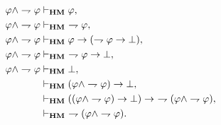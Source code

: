 	\begin{sketch}[LNC]
		\begin{align}
			\varphi \wedge \rightharpoondown \varphi &\vdash_{{\scriptsize \mbox{{\bf HM}}}} \varphi, \\
			\varphi \wedge \rightharpoondown \varphi &\vdash_{{\scriptsize \mbox{{\bf HM}}}}\ \rightharpoondown \varphi, \\
			\varphi \wedge \rightharpoondown \varphi &\vdash_{{\scriptsize \mbox{{\bf HM}}}}
				\varphi \rightarrow (\rightharpoondown \varphi \rightarrow \bot), \\
			\varphi \wedge \rightharpoondown \varphi &\vdash_{{\scriptsize \mbox{{\bf HM}}}}\ \rightharpoondown \varphi \rightarrow \bot, \\
			\varphi \wedge \rightharpoondown \varphi &\vdash_{{\scriptsize \mbox{{\bf HM}}}} \bot, \\
			&\vdash_{{\scriptsize \mbox{{\bf HM}}}} (\varphi \wedge \rightharpoondown \varphi) \rightarrow \bot, \\
			&\vdash_{{\scriptsize \mbox{{\bf HM}}}} ((\varphi \wedge \rightharpoondown \varphi) \rightarrow \bot)
				\rightarrow\ \rightharpoondown (\varphi \wedge \rightharpoondown \varphi), \\
			&\vdash_{{\scriptsize \mbox{{\bf HM}}}}\ \rightharpoondown (\varphi \wedge \rightharpoondown \varphi).
		\end{align}
		\QED
	\end{sketch}
	
